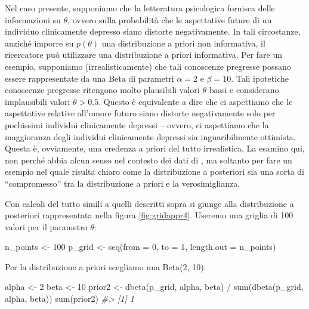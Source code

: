 \documentclass[
]{memoir}
\newenvironment{Shaded}{\begin{snugshade}}{\end{snugshade}}
\newcommand{\AttributeTok}[1]{\textcolor[rgb]{0.77,0.63,0.00}{#1}}
\newcommand{\CommentTok}[1]{\textcolor[rgb]{0.56,0.35,0.01}{\textit{#1}}}
\newcommand{\DecValTok}[1]{\textcolor[rgb]{0.00,0.00,0.81}{#1}}
\newcommand{\FunctionTok}[1]{\textcolor[rgb]{0.00,0.00,0.00}{#1}}
\newcommand{\NormalTok}[1]{#1}
\newcommand{\OtherTok}[1]{\textcolor[rgb]{0.56,0.35,0.01}{#1}}
\newcommand{\SpecialCharTok}[1]{\textcolor[rgb]{0.00,0.00,0.00}{#1}}
\begin{document}
Nel caso presente, supponiamo che la letteratura psicologica fornisca delle informazioni su \(\theta\), ovvero sulla probabilità che le aspettative future di un individuo clinicamente depresso siano distorte negativamente. In tali circostanze, anziché imporre su \(p(\theta)\) una distribuzione a priori non informativa, il ricercatore può utilizzare una distribuzione a priori informativa. Per fare un esempio, supponiamo (irrealisticamente) che tali conoscenze pregresse possano essere rappresentate da una Beta di parametri \(\alpha = 2\) e \(\beta = 10\). Tali ipotetiche conoscenze pregresse ritengono molto plausibili valori \(\theta\) bassi e considerano implausibili valori \(\theta > 0.5\). Questo è equivalente a dire che ci aspettiamo che le aspettative relative all'umore futuro siano distorte negativamente solo per pochissimi individui clinicamente depressi -- ovvero, ci aspettiamo che la maggioranza degli individui clinicamente depressi sia inguaribilmente ottimista. Questa è, ovviamente, una credenza a priori del tutto irrealistica. La esamino qui, non perché abbia alcun senso nel contesto dei dati di \citet{zetschefuture2019}, ma soltanto per fare un esempio nel quale risulta chiaro come la distribuzione a posteriori sia una sorta di ``compromesso'' tra la distribuzione a priori e la verosimiglianza.

Con calcoli del tutto simili a quelli descritti sopra si giunge alla distribuzione a posteriori rappresentata nella figura \ref{fig:gridappr4}. Useremo una griglia di 100 valori per il parametro \(\theta\):

\begin{Shaded}
\begin{Highlighting}[]
\NormalTok{n\_points }\OtherTok{\textless{}{-}} \DecValTok{100}
\NormalTok{p\_grid }\OtherTok{\textless{}{-}} \FunctionTok{seq}\NormalTok{(}\AttributeTok{from =} \DecValTok{0}\NormalTok{, }\AttributeTok{to =} \DecValTok{1}\NormalTok{, }\AttributeTok{length.out =}\NormalTok{ n\_points)}
\end{Highlighting}
\end{Shaded}

\noindent
Per la distribuzione a priori scegliamo una Beta(2, 10):

\begin{Shaded}
\begin{Highlighting}[]
\NormalTok{alpha }\OtherTok{\textless{}{-}} \DecValTok{2}
\NormalTok{beta }\OtherTok{\textless{}{-}} \DecValTok{10}
\NormalTok{prior2 }\OtherTok{\textless{}{-}} \FunctionTok{dbeta}\NormalTok{(p\_grid, alpha, beta) }\SpecialCharTok{/} \FunctionTok{sum}\NormalTok{(}\FunctionTok{dbeta}\NormalTok{(p\_grid, alpha, beta))}
\FunctionTok{sum}\NormalTok{(prior2)}
\CommentTok{\#\textgreater{} [1] 1}
\end{Highlighting}
\end{Shaded}
\end{document}
